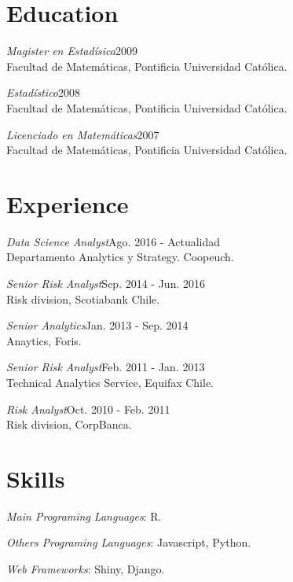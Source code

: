 \documentclass[margin]{res}
\begin{document}
\begin{resume}

\section{Education}

    {\sl Magister en Estadísica}\hfill 2009\\
    Facultad de Matemáticas, Pontificia Universidad Católica.

    {\sl Estadístico}\hfill 2008\\
    Facultad de Matemáticas, Pontificia Universidad Católica.

    {\sl Licenciado en Matemáticas}\hfill 2007\\
    Facultad de Matemáticas, Pontificia Universidad Católica.

\vspace{1cm}

\section{Experience}

     {\sl Data Science Analyst}\hfill Ago. 2016 - Actualidad\\
        Departamento Analytics y Strategy. Coopeuch.

    {\sl Senior Risk Analyst}\hfill Sep. 2014 - Jun. 2016\\
        Risk division, Scotiabank Chile.

    {\sl Senior Analytics}\hfill Jan. 2013 - Sep. 2014\\
        Anaytics, Foris.

    {\sl Senior Risk Analyst}\hfill Feb. 2011 - Jan. 2013\\
        Technical Analytics Service, Equifax Chile.

    {\sl Risk Analyst}\hfill Oct. 2010 - Feb. 2011\\
        Risk division, CorpBanca.

\vspace{1cm}

\section{Skills}

    {\sl Main Programing Languages}: R.

    {\sl Others Programing Languages}: Javascript, Python.

    {\sl Web Frameworks}: Shiny, Django.


\end{resume}
\end{document}
